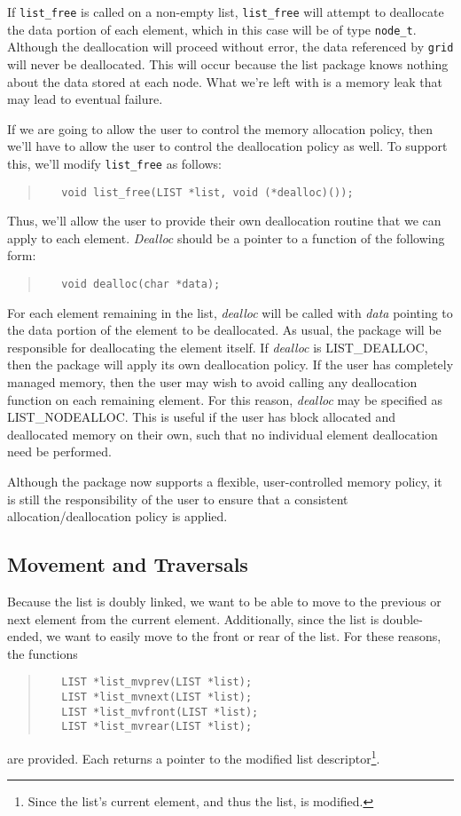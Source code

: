 If {\tt list\_free} is called on a non-empty list, {\tt list\_free} will
attempt to deallocate the data portion of each element, which in this case
will be of type {\tt node\_t}.  Although the deallocation will proceed without
error, the data referenced by {\tt grid} will never be deallocated.  This will
occur because the list package knows nothing about the data stored at each
node.  What we're left with is a memory leak that may lead to eventual
failure.

If we are going to allow the user to control the memory allocation policy,
then we'll have to allow the user to control the deallocation policy as well.
To support this, we'll modify {\tt list\_free} as follows:
\begin{quote}
\begin{verbatim}
   void list_free(LIST *list, void (*dealloc)());
\end{verbatim}
\end{quote}
Thus, we'll allow the user to provide their own deallocation routine that we
can apply to each element.  {\em Dealloc} should be a pointer to a function of
the following form:
\begin{quote}
\begin{verbatim}
   void dealloc(char *data);
\end{verbatim}
\end{quote}
For each element remaining in the list, {\em dealloc} will be called with {\em
data} pointing to the data portion of the element to be deallocated.  As
usual, the package will be responsible for deallocating the element itself.
If {\em dealloc} is LIST\_DEALLOC, then the package will apply its own
deallocation policy.  If the user has completely managed memory, then the user
may wish to avoid calling any deallocation function on each remaining element.
For this reason, {\em dealloc} may be specified as LIST\_NODEALLOC.  This is
useful if the user has block allocated and deallocated memory on their own,
such that no individual element deallocation need be performed.

Although the package now supports a flexible, user-controlled memory policy,
it is still the responsibility of the user to ensure that a consistent
allocation/deallocation policy is applied.

\subsection{Movement and Traversals}
Because the list is doubly linked, we want to be able to move to the previous
or next element from the current element.  Additionally, since the list is
double-ended, we want to easily move to the front or rear of the list.  For
these reasons, the functions
\begin{quote}
\begin{verbatim}
   LIST *list_mvprev(LIST *list);
   LIST *list_mvnext(LIST *list);
   LIST *list_mvfront(LIST *list);
   LIST *list_mvrear(LIST *list);
\end{verbatim}
\end{quote}
are provided.  Each returns a pointer to the modified list
descriptor\footnote{Since the list's current element, and thus the list, is
modified.}.

